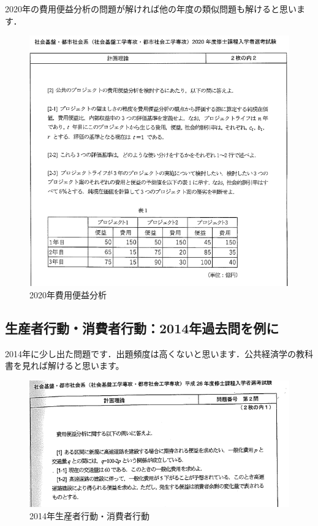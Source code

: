 \documentclass{jsarticle}
\begin{document}
2020年の費用便益分析の問題が解ければ他の年度の類似問題も解けると思います．

\begin{figure}[htbp]
  \includegraphics[keepaspectratio, width=16cm]{figures/costbenefit2020.png}
  \caption{2020年費用便益分析\label{costbenefit20201}}
\end{figure}


\subsection{生産者行動・消費者行動：2014年過去問を例に\label{action2014}}

2014年に少し出た問題です．出題頻度は高くないと思います．公共経済学の教科書を見れば解けると思います。

\begin{figure}[htbp]
  \includegraphics[keepaspectratio, width=16cm]{figures/costbenefit2014.png}
  \caption{2014年生産者行動・消費者行動\label{action20141}}
\end{figure}
\end{document}
